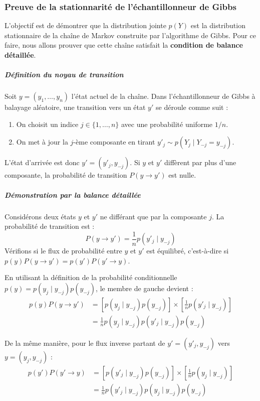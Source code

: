 \subsubsection{Preuve de la stationnarité de l'échantillonneur de Gibbs}

L'objectif est de démontrer que la distribution jointe $p(Y)$ est la distribution 
stationnaire de la chaîne de Markov construite par l'algorithme de Gibbs. 
Pour ce faire, nous allons prouver que cette chaîne satisfait la 
\textbf{condition de balance détaillée}.

\subparagraph{Définition du noyau de transition}
Soit $y = (y_1, \dots, y_n)$ l'état actuel de la chaîne. Dans l'échantillonneur de 
Gibbs à balayage aléatoire, une transition vers un état $y'$ se déroule comme suit :
\begin{enumerate}
    \item On choisit un indice $j \in \{1, \dots, n\}$ avec une probabilité uniforme $1/n$.
    \item On met à jour la $j$-ème composante en tirant $y'_j \sim p(Y_j \mid Y_{-j} = y_{-j})$.
\end{enumerate}
L'état d'arrivée est donc $y' = (y'_j, y_{-j})$. Si $y$ et $y'$ diffèrent 
par plus d'une composante, la probabilité de transition $P(y \to y')$ est nulle.

\subparagraph{Démonstration par la balance détaillée}
Considérons deux états $y$ et $y'$ ne différant que par la composante $j$. 
La probabilité de transition est :
\begin{equation}
    P(y \to y') = \frac{1}{n} p(y'_j \mid y_{-j})
\end{equation}
Vérifions si le flux de probabilité entre $y$ et $y'$ est équilibré, 
c'est-à-dire si $p(y)P(y \to y') = p(y')P(y' \to y)$.

En utilisant la définition de la probabilité conditionnelle 
$p(y) = p(y_j \mid y_{-j}) p(y_{-j})$, le membre de gauche devient :
\begin{align}
    p(y) P(y \to y') &= \left[ p(y_j \mid y_{-j}) p(y_{-j}) \right] \times \left[ \frac{1}{n} p(y'_j \mid y_{-j}) \right] \nonumber \\
    &= \frac{1}{n} p(y_j \mid y_{-j}) p(y'_j \mid y_{-j}) p(y_{-j})
\end{align}

De la même manière, pour le flux inverse partant de $y' = (y'_j, y_{-j})$ vers $y = (y_j, y_{-j})$ :
\begin{align}
    p(y') P(y' \to y) &= \left[ p(y'_j \mid y_{-j}) p(y_{-j}) \right] \times \left[ \frac{1}{n} p(y_j \mid y_{-j}) \right] \nonumber \\
    &= \frac{1}{n} p(y'_j \mid y_{-j}) p(y_j \mid y_{-j}) p(y_{-j})
\end{align}

